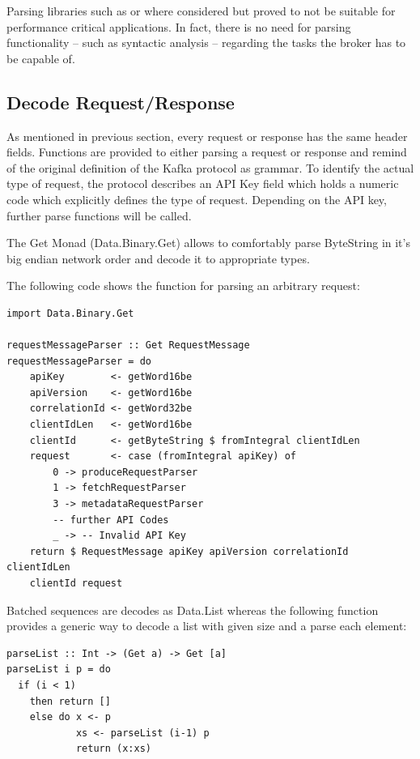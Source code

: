 Parsing libraries such as
 or
 where considered but
proved to not be suitable for performance critical applications. In fact, there
is no need for parsing functionality -- such as syntactic analysis -- regarding
the tasks the broker has to be capable of. 

\subsection{Decode Request/Response}

As mentioned in previous section, every request or response has the same header
fields. Functions are provided to either parsing a request or response and
remind of the original definition of the Kafka protocol as grammar. To identify
the actual type of request, the protocol describes an API Key field which holds
a numeric code which explicitly defines the type of request. Depending on the
API key, further parse functions will be called. 

The Get Monad (Data.Binary.Get) allows to comfortably parse ByteString in
it's big endian network order and decode it to appropriate types.

The following code shows the function for parsing an arbitrary request:

\begin{lstlisting}
import Data.Binary.Get

requestMessageParser :: Get RequestMessage 
requestMessageParser = do 
    apiKey        <- getWord16be
    apiVersion    <- getWord16be
    correlationId <- getWord32be
    clientIdLen   <- getWord16be
    clientId      <- getByteString $ fromIntegral clientIdLen
    request       <- case (fromIntegral apiKey) of
        0 -> produceRequestParser
        1 -> fetchRequestParser
        3 -> metadataRequestParser
        -- further API Codes 
        _ -> -- Invalid API Key 
    return $ RequestMessage apiKey apiVersion correlationId clientIdLen
    clientId request
\end{lstlisting}

Batched sequences are decodes as Data.List whereas the following function
provides a generic way to decode a list with given size and a parse each
element:
\begin{lstlisting}
parseList :: Int -> (Get a) -> Get [a]
parseList i p = do 
  if (i < 1) 
    then return []
    else do x <- p
            xs <- parseList (i-1) p
            return (x:xs)
\end{lstlisting}

